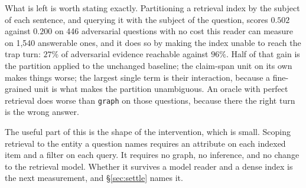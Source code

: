 \documentclass[11pt]{article}
\newcommand{\arm}[1]{\texttt{#1}}
\begin{document}
What is left is worth stating exactly. Partitioning a retrieval index by the
subject of each sentence, and querying it with the subject of the question,
scores $0.502$ against $0.200$ on 446 adversarial questions with no cost this
reader can measure on 1{,}540 answerable ones, and it does so by making the
index unable to reach the trap turn: $27\%$ of adversarial evidence reachable
against $96\%$. Half of that gain is the partition applied to the unchanged
baseline; the claim-span unit on its own makes things worse; the largest single
term is their interaction, because a fine-grained unit is what makes the
partition unambiguous. An oracle with perfect retrieval does worse than
\arm{graph} on those questions, because there the right turn is the wrong
answer.

The useful part of this is the shape of the intervention, which is small.
Scoping retrieval to the entity a question names requires an attribute on each
indexed item and a filter on each query. It requires no graph, no inference, and
no change to the retrieval model. Whether it survives a model reader and a dense
index is the next measurement, and \S\ref{sec:settle} names it.

{\small


}
\end{document}
